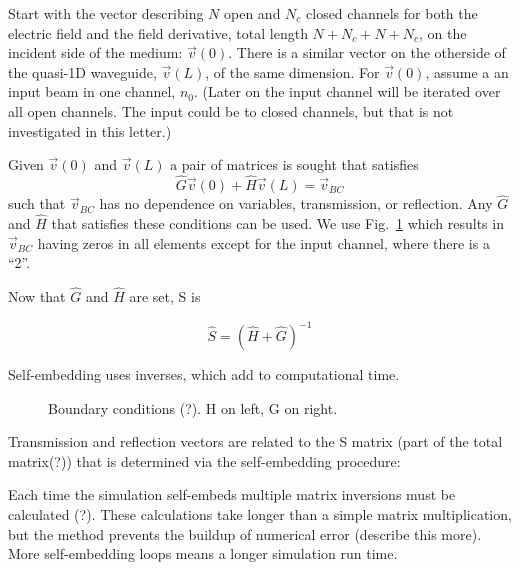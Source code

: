Start with the vector describing $N$ open and $N_c$ closed channels for both
the electric field and the field derivative, total length $N+N_c+N+N_c$, on the
incident side of the medium: $\vec{v}(0)$.  There is a similar vector on the otherside
of the quasi-1D waveguide, $\vec{v}(L)$, of the same dimension. For $\vec{v}(0)$, assume a an
input beam in one channel, $n_0$. (Later on the input channel will be iterated over
all open channels. The input could be to closed channels, but that is not investigated
in this letter.)

Given $\vec{v}(0)$ and $\vec{v}(L)$ a pair of matrices is sought that satisfies
\begin{equation}
\hat{G}\vec{v}(0) + \hat{H}\vec{v}(L) = \vec{v}_{BC}
\label{selfEmbedGHvBC}
\end{equation}
such that $\vec{v}_{BC}$ has no dependence on variables, transmission, or reflection.
Any $\hat{G}$ and $\hat{H}$ that satisfies these conditions can be used. We use
Fig.~\ref{fig:HGmatrix} which results in $\vec{v}_{BC}$ having zeros in all elements
except for the input channel, where there is a ``2''.  

Now that $\hat{G}$ and $\hat{H}$ are set, S is

\begin{equation}
\hat{S} = (\hat{H} + \hat{G})^{-1}
\label{selfEmbedSinvGH}
\end{equation}



Self-embedding uses inverses, which add to computational time.



\begin{figure}
\vskip -0.5cm
\centerline{
\quad \quad \quad \quad
}
\vskip -0.5cm
\caption{Boundary conditions (?). H on left, G on right.}
\label{fig:HGmatrix}
\end{figure}

Transmission and reflection vectors are related to the S matrix
(part of the total matrix(?)) that is determined via the self-embedding procedure:

Each time the simulation self-embeds multiple matrix inversions must
be calculated (?).  These calculations take longer than a simple matrix
multiplication, but the method prevents the buildup of numerical
error (describe this more).  More self-embedding loops means a longer simulation run time.

